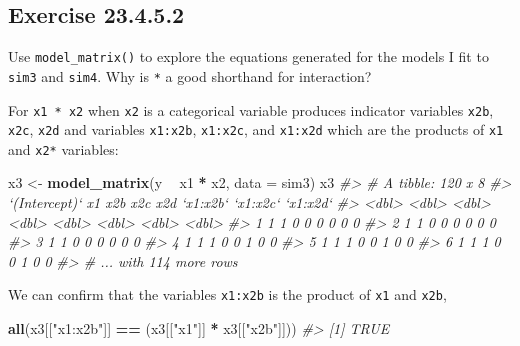 \documentclass[]{book}
\newenvironment{Shaded}{\begin{snugshade}}{\end{snugshade}}
\newcommand{\CommentTok}[1]{\textcolor[rgb]{0.56,0.35,0.01}{\textit{#1}}}
\newcommand{\DataTypeTok}[1]{\textcolor[rgb]{0.13,0.29,0.53}{#1}}
\newcommand{\KeywordTok}[1]{\textcolor[rgb]{0.13,0.29,0.53}{\textbf{#1}}}
\newcommand{\NormalTok}[1]{#1}
\newcommand{\OperatorTok}[1]{\textcolor[rgb]{0.81,0.36,0.00}{\textbf{#1}}}
\newcommand{\StringTok}[1]{\textcolor[rgb]{0.31,0.60,0.02}{#1}}
\theoremstyle{plain}
\theoremstyle{remark}
\begin{document}
\hypertarget{exercise-23.4.5.2}{%
\subsection*{\texorpdfstring{Exercise {23.4.5.2}}{Exercise 23.4.5.2}}\label{exercise-23.4.5.2}}

Use \texttt{model\_matrix()} to explore the equations generated for the models I fit to \texttt{sim3} and \texttt{sim4}.
Why is \texttt{*} a good shorthand for interaction?

For \texttt{x1\ *\ x2} when \texttt{x2} is a categorical variable produces indicator variables \texttt{x2b}, \texttt{x2c}, \texttt{x2d} and
variables \texttt{x1:x2b}, \texttt{x1:x2c}, and \texttt{x1:x2d} which are the products of \texttt{x1} and \texttt{x2*} variables:

\begin{Shaded}
\begin{Highlighting}[]
\NormalTok{x3 <-}\StringTok{ }\KeywordTok{model_matrix}\NormalTok{(y }\OperatorTok{~}\StringTok{ }\NormalTok{x1 }\OperatorTok{*}\StringTok{ }\NormalTok{x2, }\DataTypeTok{data =}\NormalTok{ sim3)}
\NormalTok{x3}
\CommentTok{#> # A tibble: 120 x 8}
\CommentTok{#>   `(Intercept)`    x1   x2b   x2c   x2d `x1:x2b` `x1:x2c` `x1:x2d`}
\CommentTok{#>           <dbl> <dbl> <dbl> <dbl> <dbl>    <dbl>    <dbl>    <dbl>}
\CommentTok{#> 1             1     1     0     0     0        0        0        0}
\CommentTok{#> 2             1     1     0     0     0        0        0        0}
\CommentTok{#> 3             1     1     0     0     0        0        0        0}
\CommentTok{#> 4             1     1     1     0     0        1        0        0}
\CommentTok{#> 5             1     1     1     0     0        1        0        0}
\CommentTok{#> 6             1     1     1     0     0        1        0        0}
\CommentTok{#> # ... with 114 more rows}
\end{Highlighting}
\end{Shaded}

We can confirm that the variables \texttt{x1:x2b} is the product of \texttt{x1} and \texttt{x2b},

\begin{Shaded}
\begin{Highlighting}[]
\KeywordTok{all}\NormalTok{(x3[[}\StringTok{"x1:x2b"}\NormalTok{]] }\OperatorTok{==}\StringTok{ }\NormalTok{(x3[[}\StringTok{"x1"}\NormalTok{]] }\OperatorTok{*}\StringTok{ }\NormalTok{x3[[}\StringTok{"x2b"}\NormalTok{]]))}
\CommentTok{#> [1] TRUE}
\end{Highlighting}
\end{Shaded}
\end{document}
